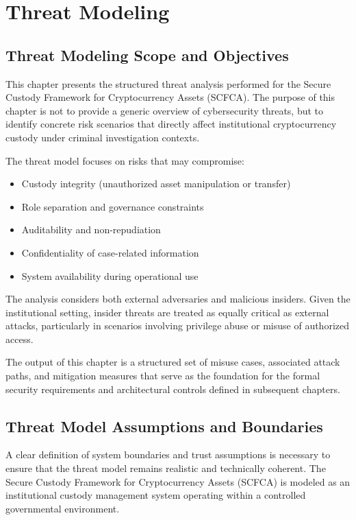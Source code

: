 \documentclass[12pt,a4paper]{report}
\begin{document}
\chapter{Threat Modeling}

\section{Threat Modeling Scope and Objectives}

This chapter presents the structured threat analysis performed for the Secure Custody Framework for Cryptocurrency Assets (SCFCA). The purpose of this chapter is not to provide a generic overview of cybersecurity threats, but to identify concrete risk scenarios that directly affect institutional cryptocurrency custody under criminal investigation contexts.

The threat model focuses on risks that may compromise:

\begin{itemize}
    \item Custody integrity (unauthorized asset manipulation or transfer)
    \item Role separation and governance constraints
    \item Auditability and non-repudiation
    \item Confidentiality of case-related information
    \item System availability during operational use
\end{itemize}

The analysis considers both external adversaries and malicious insiders. Given the institutional setting, insider threats are treated as equally critical as external attacks, particularly in scenarios involving privilege abuse or misuse of authorized access.

The output of this chapter is a structured set of misuse cases, associated attack paths, and mitigation measures that serve as the foundation for the formal security requirements and architectural controls defined in subsequent chapters.

\section{Threat Model Assumptions and Boundaries}

A clear definition of system boundaries and trust assumptions is necessary to ensure that the threat model remains realistic and technically coherent. The Secure Custody Framework for Cryptocurrency Assets (SCFCA) is modeled as an institutional custody management system operating within a controlled governmental environment.
\end{document}
